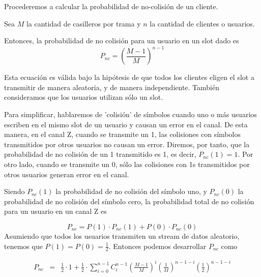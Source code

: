 Procederemos a calcular la probabilidad de no-colisión de un cliente.

Sea $M$ la cantidad de casilleros por trama y $n$ la cantidad de clientes o usuarios.

Entonces, la probabilidad de no colisión para un usuario en un slot dado es
\begin{equation}
P_{nc}=\left(\frac{M-1}{M}\right)^{n-1}
\end{equation}

Esta ecuación es válida bajo la hipótesis de que todos los clientes eligen el slot a transmitir de manera aleatoria, y de manera independiente. También consideramos que los usuarios utilizan sólo un slot.

Para simplificar, hablaremos de 'colisión' de símbolos cuando uno o más usuarios escriben en el mismo slot de un usuario y causan un error en el canal. De esta manera, en el canal Z, cuando se transmite un 1, las colisiones con símbolos transmitidos por otros usuarios no causan un error. Diremos, por tanto, que la probabilidad de no colisión de un 1 transmitido es 1, es decir, $P_{nc}(1) = 1$. Por otro lado, cuando se transmite un 0, sólo las colisiones con 1s transmitidos por otros usuarios generan error en el canal.

Siendo $P_{nc}(1)$ la probabilidad de no colisión del símbolo uno, y $P_{nc}(0)$ la probabilidad de no colisión del símbolo cero, la probabilidad total de no colisión para un usuario en un canal Z es

\begin{equation}
P_{nc}=P(1)\cdot P_{nc}(1) + P(0) \cdot P_{nc}(0) 
\end{equation}
Asumiendo que todos los usuarios transmiten un stream de datos aleatorio, tenemos que $P(1)=P(0)=\frac{1}{2}$. Entonces podemos desarrollar $P_{nc}$ como

\begin{eqnarray}
P_{nc} & = & \frac{1}{2} \cdot 1 +  \frac{1}{2} \cdot \sum_{i=0}^{n-1} 
C^{n-1}_{i} \left(\frac{M-1}{M}\right)^i  \left(\frac{1}{M}\right)^{n-1-i}  \left(\frac{1}{2}\right)^{n-1-i} 
\end{eqnarray}

